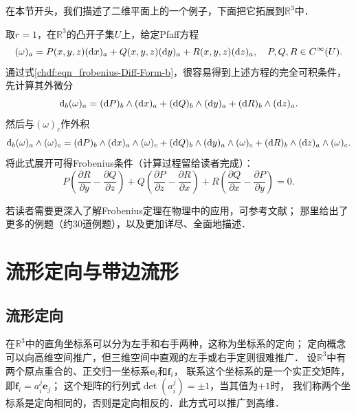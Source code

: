 在本节开头，我们描述了二维平面上的一个例子，下面把它拓展到$\mathbb{R}^3$中．
\begin{example}
    取$r=1$，在$\mathbb{R}^3$的凸开子集$U$上，给定Pfaff方程
    \begin{equation*}
        (\omega)_a = P(x,y,z)({\rm d}x)_a +Q(x,y,z)({\rm d}y)_a +R(x,y,z)({\rm d}z)_a  , \quad P,Q,R\in C^\infty(U).
    \end{equation*}
    通过式\eqref{chdf:eqn_frobenius-Diff-Form-b}，很容易得到上述方程的完全可积条件，先计算其外微分
    \begin{equation}
        {\rm d}_b (\omega)_a = ({\rm d}P)_b\wedge({\rm d}x)_a +({\rm d}Q)_b\wedge({\rm d}y)_a +({\rm d}R)_b\wedge ({\rm d}z)_a .
    \end{equation}
    然后与$(\omega)_c$作外积
    \begin{equation*}
        {\rm d}_b (\omega)_a \wedge(\omega)_c= ({\rm d}P)_b\wedge({\rm d}x)_a \wedge(\omega)_c
          +({\rm d}Q)_b\wedge({\rm d}y)_a\wedge(\omega)_c +({\rm d}R)_b\wedge ({\rm d}z)_a\wedge(\omega)_c .
    \end{equation*}
    将此式展开可得Frobenius条件（计算过程留给读者完成）：
    \begin{equation}
        P\left(\frac{\partial R}{\partial y} - \frac{\partial Q}{\partial z} \right)
       +Q\left(\frac{\partial P}{\partial z} - \frac{\partial R}{\partial x} \right)
       +R\left(\frac{\partial Q}{\partial x} - \frac{\partial P}{\partial y} \right) =0.
    \end{equation}
\end{example}


若读者需要更深入了解Frobenius定理在物理中的应用，可参考文献\parencite[Ch.8]{westenholz-1978}；
那里给出了更多的例题（约30道例题），以及更加详尽、全面地描述．

\section{流形定向与带边流形}\label{chdf:sec_oriented-manifold}
\subsection{流形定向}

在$\mathbb{R}^3$中的直角坐标系可以分为左手和右手两种，这称为坐标系的{\kaishu 定向}；
定向概念可以向高维空间推广，但三维空间中直观的左手或右手定则很难推广．
设$\mathbb{R}^3$中有两个原点重合的、正交归一坐标系$\boldsymbol{e}_i$和$\boldsymbol{f}_i$，
联系这个坐标系的是一个实正交矩阵，即$\boldsymbol{f}_i = a_i^j \boldsymbol{e}_j$；
这个矩阵的行列式$\det (a_i^j)=\pm 1$，当其值为$+1$时，
我们称两个坐标系是定向相同的，否则是定向相反的．此方式可以推广到高维．


